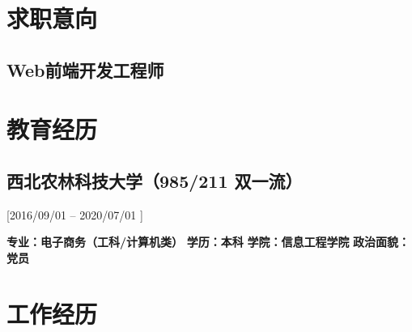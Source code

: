 \documentclass{mycv}
\begin{document}
\maketitle%

\section{求职意向}

\subsection{Web前端开发工程师}

\section{教育经历}
\subsection{西北农林科技大学（985/211 双一流）}[2016/09/01 – 2020/07/01 ]

\textbf{专业：电子商务（工科/计算机类）}  \hspace{1.5em}   \textbf{学历：本科}  \hspace{1.5em}   \textbf{学院：信息工程学院}   \hspace{1.5em}  \textbf{政治面貌：党员}


\section{工作经历}
\end{document}
